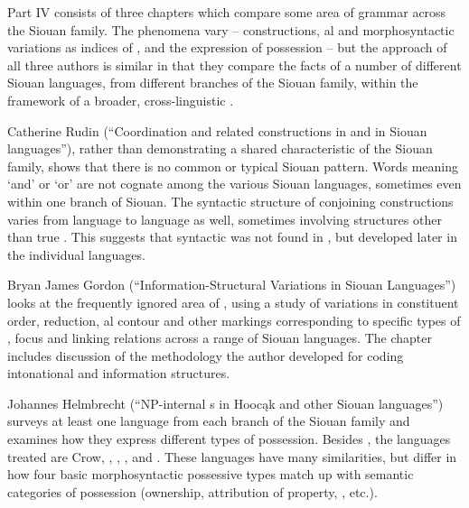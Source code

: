 \begin{refsection}

Part IV consists of three chapters which compare some area of grammar across the Siouan family. The phenomena vary --  constructions, al and morphosyntactic variations as indices of , and the expression of possession -- but the approach of all three authors is similar in that they compare the facts of a number of different Siouan languages, from different branches of the Siouan family, within the framework of a broader, cross-linguistic .

Catherine Rudin (``Coordination and related constructions in  and in Siouan languages''), rather than demonstrating a shared characteristic of the Siouan family, shows that there is no common or typical Siouan  pattern. Words meaning `and' or `or' are not cognate among the various Siouan languages, sometimes even within one branch of Siouan. The syntactic structure of conjoining constructions varies from language to language as well, sometimes involving structures other than true . This suggests that syntactic  was not found in , but developed later in the individual languages.

Bryan James Gordon (``Information-Structural Variations in Siouan Languages'') looks at the frequently ignored area of , using a  study of variations in constituent order, reduction, al contour and other markings corresponding to specific types of , focus and linking relations across a range of Siouan languages. The chapter includes discussion of the methodology the author developed for coding intonational and information structures.


Johannes Helmbrecht (``NP-internal s in Hooc\k{a}k and other Siouan languages'') surveys at least one language from each branch of the Siouan family and examines how they express different types of possession. Besides , the languages treated are Crow, , , ,  and . These languages have many similarities, but differ in how four basic morphosyntactic possessive types match up with semantic categories of possession (ownership, attribution of property, , etc.).


 
\end{refsection}

